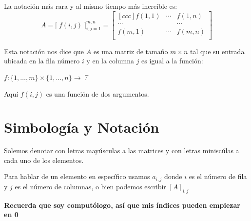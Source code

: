 \documentclass[12pt, fleqn]{report}                             %
\theoremstyle{break}                                            %
\DeclareMathOperator \GenericField {\mathbb{F}}                 %
\newcommand{\BigBrackets}[1] {\Big[ \; #1 \; \Big]}             %
\begin{document}
                La notación más rara y al mismo tiempo más increíble es:
                \begin{equation*}
                    A   
                        = \BigBrackets{ f(i,j) }_{i, j = 1}^{m, n}
                        =
                        \begin{bmatrix}[ccc]
                            f(1,1)  & \cdots & f(1,n)   \\
                            \cdots  &        & \cdots   \\
                            f(m, 1) & \cdots & f(m,n)   \\
                        \end{bmatrix}
                \end{equation*}

                Esta notación nos dice que $A$ es una matriz de tamaño $m \times n$ tal
                que su entrada ubicada en la fila número $i$ y en la columna $j$ es igual
                a la función: 

                $f: \{1, \dots, m\} \times \{1, \dots, n\} \to \GenericField$
                
                Aquí $f(i, j)$ es una función de dos argumentos.


        \vspace{1em}
        \section{Simbología y Notación}

            Solemos denotar con letras mayúsculas a las matrices y con letras miniscúlas
            a cada uno de los elementos.

            Para hablar de un elemento en específico usamos $a_{i,j}$ donde $i$ es el
            número de fila y $j$ es el número de columnas, o bien podemos escribir $[A]_{i,j}$

            \textbf{Recuerda que soy computólogo, así que mis índices pueden empiezar en 0}


\end{document}
